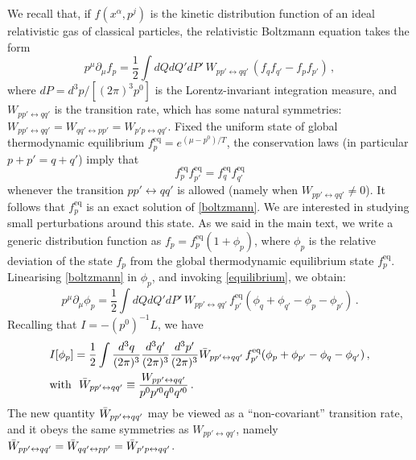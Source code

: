 \documentclass[a4paper, amsfonts, amssymb, amsmath, reprint, showkeys, nofootinbib, twoside, onecolumn,notitlepage]{revtex4-2}
\theoremstyle{definition}
\theoremstyle{theorem}
\theoremstyle{corollary}
\begin{document}
We recall that, if $f(x^\alpha,p^j)$ is the kinetic distribution function of an ideal relativistic gas of classical particles, the relativistic Boltzmann equation takes the form \cite{Groot1980RelativisticKT}
\begin{equation}\label{boltzmann}
    p^\mu \partial_\mu f_p =\dfrac{1}{2} \int dQ dQ' dP' \, W_{pp'\leftrightarrow qq'} \, (f_q f_{q'}-f_p f_{p'}) \, ,
\end{equation}
where $dP=d^3p/[(2\pi)^3 p^0]$ is the Lorentz-invariant integration measure, and $W_{pp'\leftrightarrow qq'}$ is the transition rate, which has some natural symmetries: $    W_{pp'\leftrightarrow qq'}=W_{qq'\leftrightarrow pp'}=W_{p'p\leftrightarrow qq'}$.
Fixed the uniform state of global thermodynamic equilibrium $f_p^{\text{eq}}=e^{(\mu-p^0)/T}$, the conservation laws (in particular $p+p'=q+q'$) imply that
\begin{equation}\label{equilibrium}
    f^{\text{eq}}_p f^{\text{eq}}_{p'} = f^{\text{eq}}_q f^{\text{eq}}_{q'}
\end{equation}
whenever the transition $pp'{\leftrightarrow} qq'$ is allowed (namely when $W_{pp'\leftrightarrow qq'} \neq 0$). It follows that $f_p^{\text{eq}}$ is an exact solution of \eqref{boltzmann}. We are interested in studying small perturbations around this state. As we said in the main text, we write a generic distribution function as $f_p=f^\text{eq}_p(1+\phi_p)$, where $\phi_p$ is the relative deviation of the state $f_p$ from the global thermodynamic equilibrium state $f^{\text{eq}}_p$. Linearising \eqref{boltzmann} in $\phi_p$, and invoking \eqref{equilibrium}, we obtain:
\begin{equation}\label{linBoltzmann}
    p^\mu \partial_\mu \phi_p = \dfrac{1}{2} \int dQ dQ' dP' \, W_{pp'\leftrightarrow qq'} \,  f^{\text{eq}}_{p'}(\phi_q+\phi_{q'}-\phi_p-\phi_{p'}) \, .
\end{equation}
Recalling that $I=-(p^0)^{-1}L$, we have
\begin{equation}
    \begin{split}
& I[\phi_p] =  \dfrac{1}{2} \int \dfrac{d^3 q}{(2\pi)^3} \dfrac{d^3 q'}{(2\pi)^3} \dfrac{d^3 p'}{(2\pi)^3}  \Bar{W}_{pp'\leftrightarrow qq'} \,  f^{\text{eq}}_{p'}(\phi_p+\phi_{p'}-\phi_q-\phi_{q'}) \,  ,\\
& \text{with } \, \, \Bar{W}_{pp'\leftrightarrow qq'} \equiv \dfrac{ W_{pp'\leftrightarrow qq'}}{p^0 p'^0 q^0 q'^0} \, . \\
    \end{split}
\end{equation}
The new quantity $\Bar{W}_{pp'\leftrightarrow qq'}$ may be viewed as a ``non-covariant'' transition rate, and it obeys the same symmetries as $W_{pp'\leftrightarrow qq'}$, namely $    \Bar{W}_{pp'\leftrightarrow qq'}=\Bar{W}_{qq'\leftrightarrow pp'}=\Bar{W}_{p'p\leftrightarrow qq'}$. 
\end{document}
